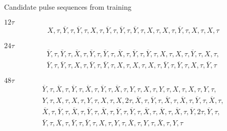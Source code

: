 \documentclass{beamer}
\begin{document}
\begin{frame}{Candidate pulse sequences from training}
%

\noindent $12\tau$
\begin{equation*}
\begin{aligned}
    X, \tau, \overline{Y}, \tau, \overline{Y}, \tau, X, \tau, \overline{Y}, \tau, \overline{Y}, \tau, \overline{Y}, \tau, X, \tau, X, \tau, \overline{Y}, \tau, X, \tau, X, \tau
\end{aligned}
\end{equation*}

\noindent $24\tau$
\begin{equation*}
\begin{aligned}
    \overline{Y}, \tau, \overline{Y}, \tau, \overline{X}, \tau, \overline{Y}, \tau, \overline{Y}, \tau, \overline{X}, \tau, \overline{Y}, \tau, \overline{Y}, \tau, X, \tau, X, \tau, \overline{Y}, \tau, X, \tau, \\
    \overline{Y}, \tau, \overline{Y}, \tau, X, \tau, \overline{Y}, \tau, \overline{Y}, \tau, X, \tau, X, \tau, X, \tau, \overline{Y}, \tau, \overline{Y}, \tau, X, \tau, \overline{Y}, \tau
\end{aligned}
\end{equation*}

\noindent $48\tau$
\begin{equation*}
\begin{aligned}
    \overline{Y}, \tau, \overline{X}, \tau, \overline{Y}, \tau, \overline{X}, \tau, \overline{Y}, \tau, \overline{X}, \tau, Y, \tau, X, \tau, Y, \tau, X, \tau, X, \tau, Y, \tau, \\
    Y, \tau, X, \tau, X, \tau, Y, \tau, X, \tau, X, 2\tau, \overline{X}, \tau, \overline{Y}, \tau, \overline{X}, \tau, \overline{X}, \tau, \overline{Y}, \tau, \overline{X}, \tau, \\
    \overline{X}, \tau, \overline{Y}, \tau, \overline{X}, \tau, \overline{Y}, \tau, \overline{X}, \tau, \overline{Y}, \tau, \overline{Y}, \tau,
    \overline{X}, \tau, \overline{X}, \tau, \overline{X}, \tau, \overline{Y}, 2\tau, \overline{Y}, \tau, \\
    \overline{Y}, \tau, \overline{X}, \tau, \overline{Y}, \tau, \overline{Y}, \tau, X, \tau, Y, \tau, \overline{X}, \tau, Y, \tau, \overline{X}, \tau, Y, \tau
\end{aligned}
\end{equation*}

\end{frame}
\end{document}
